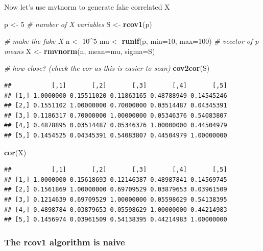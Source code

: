 \documentclass[]{book}
\newenvironment{Shaded}{\begin{snugshade}}{\end{snugshade}}
\newcommand{\KeywordTok}[1]{\textcolor[rgb]{0.13,0.29,0.53}{\textbf{#1}}}
\newcommand{\DataTypeTok}[1]{\textcolor[rgb]{0.13,0.29,0.53}{#1}}
\newcommand{\DecValTok}[1]{\textcolor[rgb]{0.00,0.00,0.81}{#1}}
\newcommand{\StringTok}[1]{\textcolor[rgb]{0.31,0.60,0.02}{#1}}
\newcommand{\CommentTok}[1]{\textcolor[rgb]{0.56,0.35,0.01}{\textit{#1}}}
\newcommand{\OperatorTok}[1]{\textcolor[rgb]{0.81,0.36,0.00}{\textbf{#1}}}
\newcommand{\NormalTok}[1]{#1}
\begin{document}
Now let's use mvtnorm to generate fake correlated X

\begin{Shaded}
\begin{Highlighting}[]
\NormalTok{p <-}\StringTok{ }\DecValTok{5} \CommentTok{# number of X variables}
\NormalTok{S <-}\StringTok{ }\KeywordTok{rcov1}\NormalTok{(p)}

\CommentTok{# make the fake X}
\NormalTok{n <-}\StringTok{ }\DecValTok{10}\OperatorTok{^}\DecValTok{5}
\NormalTok{mu <-}\StringTok{ }\KeywordTok{runif}\NormalTok{(p, }\DataTypeTok{min=}\DecValTok{10}\NormalTok{, }\DataTypeTok{max=}\DecValTok{100}\NormalTok{) }\CommentTok{# vecctor of p means}
\NormalTok{X <-}\StringTok{ }\KeywordTok{rmvnorm}\NormalTok{(n, }\DataTypeTok{mean=}\NormalTok{mu, }\DataTypeTok{sigma=}\NormalTok{S)}

\CommentTok{# how close? (check the cor as this is easier to scan)}
\KeywordTok{cov2cor}\NormalTok{(S)}
\end{Highlighting}
\end{Shaded}

\begin{verbatim}
##           [,1]       [,2]       [,3]       [,4]       [,5]
## [1,] 1.0000000 0.15511020 0.11863165 0.48788949 0.14545246
## [2,] 0.1551102 1.00000000 0.70000000 0.03514487 0.04345391
## [3,] 0.1186317 0.70000000 1.00000000 0.05346376 0.54083807
## [4,] 0.4878895 0.03514487 0.05346376 1.00000000 0.44504979
## [5,] 0.1454525 0.04345391 0.54083807 0.44504979 1.00000000
\end{verbatim}

\begin{Shaded}
\begin{Highlighting}[]
\KeywordTok{cor}\NormalTok{(X)}
\end{Highlighting}
\end{Shaded}

\begin{verbatim}
##           [,1]       [,2]       [,3]       [,4]       [,5]
## [1,] 1.0000000 0.15618693 0.12146387 0.48987841 0.14569745
## [2,] 0.1561869 1.00000000 0.69709529 0.03879653 0.03961509
## [3,] 0.1214639 0.69709529 1.00000000 0.05598629 0.54138395
## [4,] 0.4898784 0.03879653 0.05598629 1.00000000 0.44214983
## [5,] 0.1456974 0.03961509 0.54138395 0.44214983 1.00000000
\end{verbatim}

\subsubsection{The rcov1 algorithm is
naive}\label{the-rcov1-algorithm-is-naive}
\end{document}
